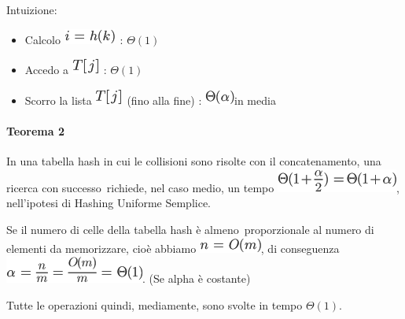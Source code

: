\documentclass{article}
\providecommand{\tightlist}{%
  \setlength{\itemsep}{0pt}\setlength{\parskip}{0pt}}
\let\oldparagraph\paragraph
\renewcommand{\paragraph}[1]{\oldparagraph{#1}\mbox{}}
\begin{document}
{Intuizione:}

\begin{itemize}
\tightlist
\item
  {Calcolo }\includegraphics{images/image248.png}{~:
  }$\Theta(1)$
\item
  {Accedo a }\includegraphics{images/image244.png}{~:
  }$\Theta(1)$
\item
  {Scorro la lista }\includegraphics{images/image244.png}{~(fino alla
  fine) : }\includegraphics{images/image249.png}{in media}
\end{itemize}

{}

\hypertarget{h.u0cyuvvucft2}{\paragraph{\texorpdfstring{{Teorema
2}}{Teorema 2}}\label{h.u0cyuvvucft2}}

{In una tabella hash in cui le collisioni sono risolte con il
concatenamento, una }{ricerca con successo}{~richiede, nel caso medio,
un tempo }\includegraphics{images/image250.png}{, nell'ipotesi di
Hashing Uniforme Semplice.}

{}

{Se il numero di celle della tabella hash è }{almeno}{~proporzionale al
numero di elementi da memorizzare, cioè abbiamo
}\includegraphics{images/image251.png}{, di conseguenza
}\includegraphics{images/image252.png}{. (Se alpha è costante) }

Tutte le operazioni quindi, mediamente, sono svolte in tempo $\Theta(1)$.
\end{document}
